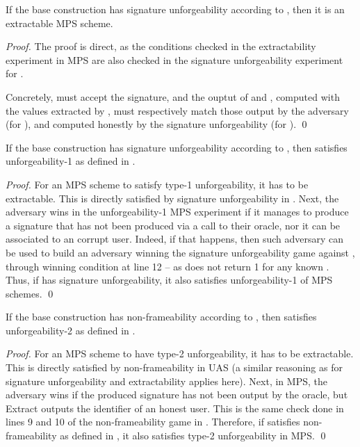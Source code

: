 \begin{theorem}
  If the base \CUASGen construction has signature unforgeability according to
  , then it is an extractable MPS scheme.
\end{theorem}

\begin{proof}
  The proof is direct, as the conditions checked in the extractability
  experiment in MPS are also checked in the signature unforgeability experiment
  for \UAS.

  Concretely, \Verify must accept the signature, and the ouptut of \feval and
  \finsp, computed with the values extracted by \ExtractSign, must respectively
  match those output by the adversary (for \feval), and computed honestly by the
  signature unforgeability (for \finsp).  
  \qed
\end{proof}

\begin{theorem}
  If the base \CUASGen construction has signature unforgeability according to
  , then \CUASMPS satisfies unforgeability-1 as
  defined in \needcite.
\end{theorem}

\begin{proof}
  For an MPS scheme to satisfy type-1 unforgeability, it has to be extractable.
  This is directly satisfied by signature unforgeability in \UAS.
  Next, the adversary wins in the unforgeability-1 MPS experiment if it manages
  to produce a signature that has not been produced via a call to their \SIGN
  oracle, nor it can be associated to an corrupt user. Indeed, if that happens,
  then such adversary can be used to build an adversary winning the signature
  unforgeability game against \CUASMPS, through winning condition at line 12 --
  as \IdentifySig does not return 1 for any known \uid. Thus, if \CUASMPS has
  signature unforgeability, it also satisfies unforgeability-1 of MPS schemes.
  \qed
\end{proof}

\begin{theorem}
  If the base \CUASGen construction has non-frameability according to
  , then \CUASMPS satisfies unforgeability-2 as
  defined in \needcite.
\end{theorem}

\begin{proof}
  For an MPS scheme to have type-2 unforgeability, it has to be extractable.
  This is directly satisfied by non-frameability in UAS (a similar reasoning
  as for signature unforgeability and extractability applies here).
  Next, in MPS, the adversary wins if the produced signature has not been
  output by the \SIGN oracle, but Extract outputs the identifier of an honest
  user. This is the same check done in lines 9 and 10 of the non-frameability
  game in \UAS. Therefore, if \CUASMPS satisfies non-frameability as defined in
  , it also satisfies type-2 unforgeability in MPS.
  \qed
\end{proof}

